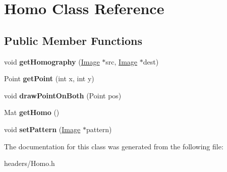 \hypertarget{class_homo}{\section{Homo Class Reference}
\label{class_homo}
}
\subsection*{Public Member Functions}
\begin{DoxyCompactItemize}
\item 
\hypertarget{class_homo_aae66ec23888cf77659ddad42aaefa3e0}{void {\bfseries get\-Homography} (\hyperlink{class_image}{Image} $\ast$src, \hyperlink{class_image}{Image} $\ast$dest)}\label{class_homo_aae66ec23888cf77659ddad42aaefa3e0}

\item 
\hypertarget{class_homo_a33b7bc4f6e860f195e30707747a432e1}{Point {\bfseries get\-Point} (int x, int y)}\label{class_homo_a33b7bc4f6e860f195e30707747a432e1}

\item 
\hypertarget{class_homo_a5c41814f462667c7fe0b49afe040ac09}{void {\bfseries draw\-Point\-On\-Both} (Point pos)}\label{class_homo_a5c41814f462667c7fe0b49afe040ac09}

\item 
\hypertarget{class_homo_ade0a2631efe7477cc63d642d300a4d23}{Mat {\bfseries get\-Homo} ()}\label{class_homo_ade0a2631efe7477cc63d642d300a4d23}

\item 
\hypertarget{class_homo_aaf9f8de23b9cd624c4f9ac49df6155fc}{void {\bfseries set\-Pattern} (\hyperlink{class_image}{Image} $\ast$pattern)}\label{class_homo_aaf9f8de23b9cd624c4f9ac49df6155fc}

\end{DoxyCompactItemize}


The documentation for this class was generated from the following file\-:\begin{DoxyCompactItemize}
\item 
headers/Homo.\-h\end{DoxyCompactItemize}
